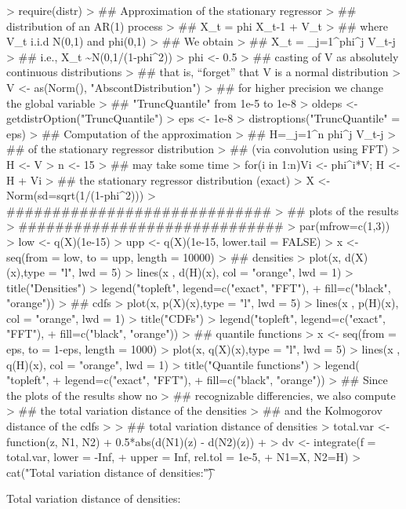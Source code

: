 \documentclass[11pt]{article}
\begin{document}
\begin{Schunk}
\begin{Sinput}
> require(distr)
> ## Approximation of the stationary regressor 
> ## distribution of an AR(1) process 
> ##       X_t = phi X_{t-1} + V_t 
> ## where V_t i.i.d N(0,1) and phi\in(0,1)
> ## We obtain 
> ##    X_t = \sum_{j=1}^\infty phi^j V_{t-j}
> ## i.e., X_t \sim N(0,1/(1-phi^2))
> phi <- 0.5
> ## casting of V as absolutely continuous distributions
> ## that is, ``forget'' that V is a normal distribution
> V <- as(Norm(), "AbscontDistribution")
> ## for higher precision we change the global variable
> ## "TruncQuantile" from 1e-5 to 1e-8
> oldeps <- getdistrOption("TruncQuantile")
> eps <- 1e-8
> distroptions("TruncQuantile" = eps)
> ## Computation of the approximation 
> ##      H=\sum_{j=1}^n phi^j V_{t-j}
> ## of the stationary regressor distribution 
> ## (via convolution using FFT)
> H <- V
> n <- 15 
> ## may take some time
> for(i in 1:n){Vi <- phi^i*V; H <- H + Vi } 
> ## the stationary regressor distribution (exact)
> X <- Norm(sd=sqrt(1/(1-phi^2)))
> #############################
> ## plots of the results
> #############################
> par(mfrow=c(1,3))
> low <- q(X)(1e-15)
> upp <- q(X)(1e-15, lower.tail = FALSE)
> x <- seq(from = low, to = upp, length = 10000)
> ## densities
> plot(x, d(X)(x),type = "l", lwd = 5)
> lines(x , d(H)(x), col = "orange", lwd = 1)
> title("Densities")
> legend("topleft", legend=c("exact", "FFT"), 
+         fill=c("black", "orange"))
> ## cdfs
> plot(x, p(X)(x),type = "l", lwd = 5)
> lines(x , p(H)(x), col = "orange", lwd = 1)
> title("CDFs")
> legend("topleft", legend=c("exact", "FFT"), 
+         fill=c("black", "orange"))
> ## quantile functions
> x <- seq(from = eps, to = 1-eps, length = 1000)
> plot(x, q(X)(x),type = "l", lwd = 5)
> lines(x , q(H)(x), col = "orange", lwd = 1)
> title("Quantile functions")
> legend( "topleft", 
+         legend=c("exact", "FFT"), 
+         fill=c("black", "orange"))
> ## Since the plots of the results show no 
> ## recognizable differencies, we also compute 
> ## the total variation distance of the densities 
> ## and the Kolmogorov distance of the cdfs
> 
> ## total variation distance of densities
> total.var <- function(z, N1, N2){
+     0.5*abs(d(N1)(z) - d(N2)(z))
+ }
> dv <- integrate(f = total.var, lower = -Inf, 
+                 upper = Inf, rel.tol = 1e-5, 
+                 N1=X, N2=H)
> cat("Total variation distance of densities:\t")
\end{Sinput}
\begin{Soutput}
Total variation distance of densities:	

\end{Soutput}
\end{Schunk}
\end{document}
